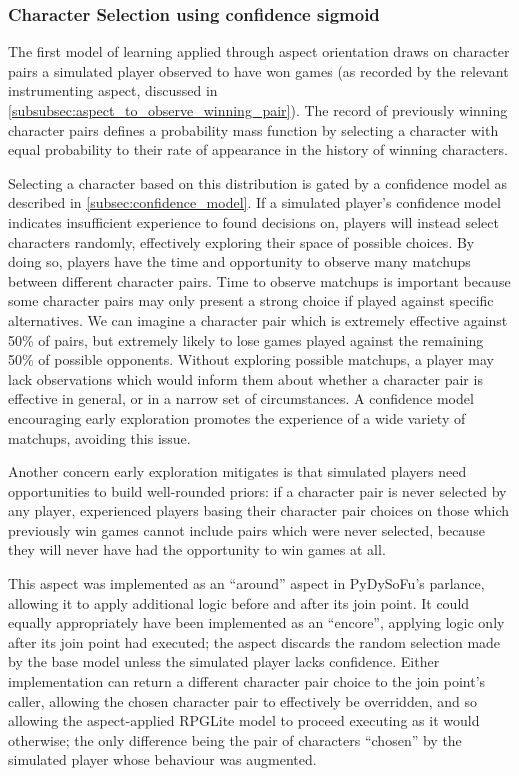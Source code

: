\subsubsection{Character Selection using confidence sigmoid}
\label{subsubsec:learning_by_picking_from_distribution_of_wins_with_confidence}

The first model of learning applied through aspect orientation draws on
character pairs a simulated player observed to have won games (as recorded by
the relevant instrumenting aspect, discussed in
\cref{subsubsec:aspect_to_observe_winning_pair}). The record of previously
winning character pairs defines a probability mass function by selecting a
character with equal probability to their rate of appearance in the history of
winning characters.

Selecting a character based on this distribution is gated by a confidence model
as described in \cref{subsec:confidence_model}. If a simulated player's
confidence model indicates insufficient experience to found decisions on,
players will instead select characters randomly, effectively exploring their
space of possible choices. By doing so, players have the time and opportunity to
observe many matchups between different character pairs. Time to observe
matchups is important because some character pairs may only present a strong
choice if played against specific alternatives. We can imagine a character pair
which is extremely effective against 50\% of pairs, but extremely likely to lose
games played against the remaining 50\% of possible opponents. Without exploring
possible matchups, a player may lack observations which would inform them about
whether a character pair is effective in general, or in a narrow set of
circumstances. A confidence model encouraging early exploration promotes the
experience of a wide variety of matchups, avoiding this issue.

Another concern early exploration mitigates is that simulated players need
opportunities to build well-rounded priors: if a character pair is never
selected by any player, experienced players basing their character pair choices
on those which previously win games cannot include pairs which were never
selected, because they will never have had the opportunity to win games at all.

This aspect was implemented as an ``around'' aspect in PyDySoFu's parlance,
allowing it to apply additional logic before and after its join point. It could
equally appropriately have been implemented as an ``encore'', applying logic
only after its join point had executed; the aspect discards the random selection
made by the base model unless the simulated player lacks confidence. Either
implementation can return a different character pair choice to the join point's
caller, allowing the chosen character pair to effectively be overridden, and so
allowing the aspect-applied RPGLite model to proceed executing as it would
otherwise; the only difference being the pair of characters ``chosen'' by the
simulated player whose behaviour was augmented.



